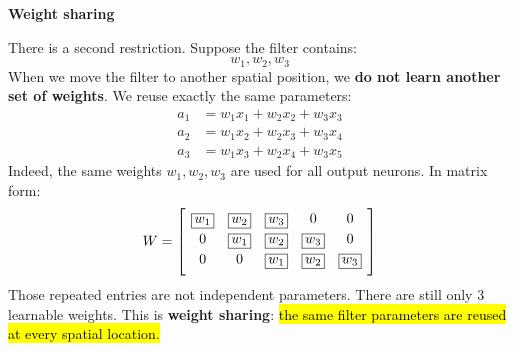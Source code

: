 \highspace
\begin{flushleft}
    \textcolor{Green3}{ \textbf{Weight sharing}}\label{sec:weight-sharing}
\end{flushleft}
There is a second restriction. Suppose the filter contains:
\begin{equation*}
    w_1, w_2, w_3
\end{equation*}
When we move the filter to another spatial position, we \textbf{do not learn another set of weights}. We reuse exactly the same parameters:
\begin{align*}
    a_1 &= w_1 x_1 + w_2 x_2 + w_3 x_3 \\
    a_2 &= w_1 x_2 + w_2 x_3 + w_3 x_4 \\
    a_3 &= w_1 x_3 + w_2 x_4 + w_3 x_5
\end{align*}
Indeed, the same weights $w_1, w_2, w_3$ are used for all output neurons. In matrix form:
\begin{equation*}
    \begingroup
    \setlength{\fboxsep}{2pt}
    \renewcommand{\arraystretch}{1.2}
    W = \left[\begin{array}{@{\hspace{4pt}}ccccc@{\hspace{4pt}}}
        \boxed{w_1} & \boxed{w_2} & \boxed{w_3} & 0 & 0 \\
        0 & \boxed{w_1} & \boxed{w_2} & \boxed{w_3} & 0 \\
        0 & 0 & \boxed{w_1} & \boxed{w_2} & \boxed{w_3} \\[.4em]
    \end{array}\right]
    \endgroup
\end{equation*}
Those repeated entries are not independent parameters. There are still only 3 learnable weights. This is \textbf{weight sharing}: \hl{the same filter parameters are reused at every spatial location.}

